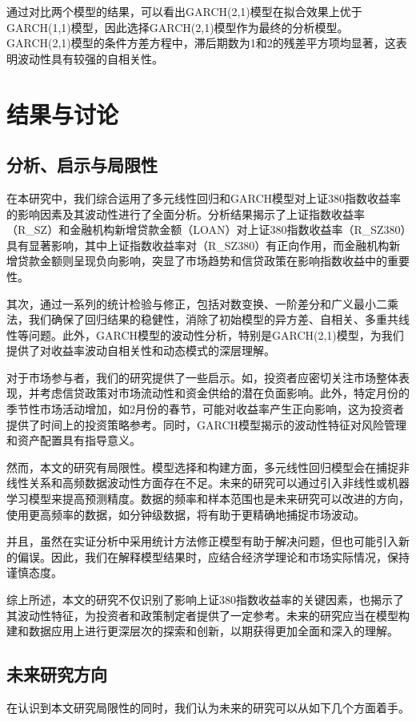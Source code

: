 \documentclass[12pt, a4paper]{article}
\numberwithin{equation}{section}
\begin{document}
通过对比两个模型的结果，可以看出GARCH(2,1)模型在拟合效果上优于GARCH(1,1)模型，因此选择GARCH(2,1)模型作为最终的分析模型。GARCH(2,1)模型的条件方差方程中，滞后期数为1和2的残差平方项均显著，这表明波动性具有较强的自相关性。


\newpage
\section{结果与讨论}
\subsection{分析、启示与局限性}
在本研究中，我们综合运用了多元线性回归和GARCH模型对上证380指数收益率的影响因素及其波动性进行了全面分析。分析结果揭示了上证指数收益率（R\_SZ）和金融机构新增贷款金额（LOAN）对上证380指数收益率（R\_SZ380）具有显著影响，其中上证指数收益率对（R\_SZ380）有正向作用，而金融机构新增贷款金额则呈现负向影响，突显了市场趋势和信贷政策在影响指数收益中的重要性。

其次，通过一系列的统计检验与修正，包括对数变换、一阶差分和广义最小二乘法，我们确保了回归结果的稳健性，消除了初始模型的异方差、自相关、多重共线性等问题。此外，GARCH模型的波动性分析，特别是GARCH(2,1)模型，为我们提供了对收益率波动自相关性和动态模式的深层理解。

对于市场参与者，我们的研究提供了一些启示。如，投资者应密切关注市场整体表现，并考虑信贷政策对市场流动性和资金供给的潜在负面影响。此外，特定月份的季节性市场活动增加，如2月份的春节，可能对收益率产生正向影响，这为投资者提供了时间上的投资策略参考。同时，GARCH模型揭示的波动性特征对风险管理和资产配置具有指导意义。

然而，本文的研究有局限性。模型选择和构建方面，多元线性回归模型会在捕捉非线性关系和高频数据波动性方面存在不足。未来的研究可以通过引入非线性或机器学习模型来提高预测精度。数据的频率和样本范围也是未来研究可以改进的方向，使用更高频率的数据，如分钟级数据，将有助于更精确地捕捉市场波动。

并且，虽然在实证分析中采用统计方法修正模型有助于解决问题，但也可能引入新的偏误。因此，我们在解释模型结果时，应结合经济学理论和市场实际情况，保持谨慎态度。

综上所述，本文的研究不仅识别了影响上证380指数收益率的关键因素，也揭示了其波动性特征，为投资者和政策制定者提供了一定参考。未来的研究应当在模型构建和数据应用上进行更深层次的探索和创新，以期获得更加全面和深入的理解。

\subsection{未来研究方向}
在认识到本文研究局限性的同时，我们认为未来的研究可以从如下几个方面着手。
\end{document}
